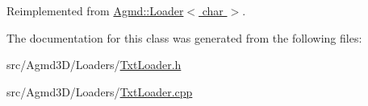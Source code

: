Reimplemented from \hyperlink{class_agmd_1_1_loader_abf633648c648f0c6152a559c3e4be682}{Agmd\+::\+Loader$<$ char $>$}.



The documentation for this class was generated from the following files\+:\begin{DoxyCompactItemize}
\item 
src/\+Agmd3\+D/\+Loaders/\hyperlink{_txt_loader_8h}{Txt\+Loader.\+h}\item 
src/\+Agmd3\+D/\+Loaders/\hyperlink{_txt_loader_8cpp}{Txt\+Loader.\+cpp}\end{DoxyCompactItemize}
